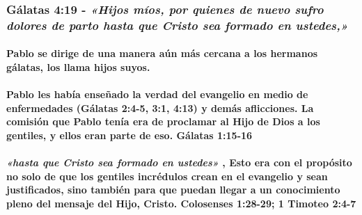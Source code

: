 \documentclass[11a pt,twoside]{article}
\newcommand{\scripture}[1]{%
  {\fontsize{12pt}{16pt}\selectfont\ScriptureFont\itshape #1}%
}
\let\oldsubsubsection\subsubsection
\renewcommand{\subsubsection}{\needspace{4\baselineskip}\oldsubsubsection}
\let\oldparagraph\paragraph
\renewcommand{\paragraph}{\needspace{3\baselineskip}\oldparagraph}
\begin{document}
\subsubsection{\texorpdfstring{Gálatas 4:19 -
\scripture{«Hijos míos, por quienes de nuevo sufro dolores de parto hasta que Cristo sea formado en ustedes,»}}{Gálatas 4:19 - }}\label{guxe1latas-419---hijos-muxedos-por-quienes-de-nuevo-sufro-dolores-de-parto-hasta-que-cristo-sea-formado-en-ustedes}

\paragraph{Pablo se dirige de una manera aún más cercana a los hermanos
gálatas, los llama hijos
suyos.}\label{pablo-se-dirige-de-una-manera-auxfan-muxe1s-cercana-a-los-hermanos-guxe1latas-los-llama-hijos-suyos.}

\paragraph{Pablo les había enseñado la verdad del evangelio en medio de
enfermedades (Gálatas 2:4-5, 3:1, 4:13) y demás aflicciones. La comisión
que Pablo tenía era de proclamar al Hijo de Dios a los gentiles, y ellos
eran parte de eso. Gálatas
1:15-16}\label{pablo-les-habuxeda-enseuxf1ado-la-verdad-del-evangelio-en-medio-de-enfermedades-guxe1latas-24-5-31-413-y-demuxe1s-aflicciones.-la-comisiuxf3n-que-pablo-tenuxeda-era-de-proclamar-al-hijo-de-dios-a-los-gentiles-y-ellos-eran-parte-de-eso.-guxe1latas-115-16}

\paragraph{\texorpdfstring{\scripture{«hasta que Cristo sea formado en ustedes»},
Esto era con el propósito no solo de que los gentiles incrédulos crean
en el evangelio y sean justificados, sino también para que puedan llegar
a un conocimiento pleno del mensaje del Hijo, Cristo. Colosenses
1:28-29; 1 Timoteo
2:4-7}{, Esto era con el propósito no solo de que los gentiles incrédulos crean en el evangelio y sean justificados, sino también para que puedan llegar a un conocimiento pleno del mensaje del Hijo, Cristo. Colosenses 1:28-29; 1 Timoteo 2:4-7}}\label{hasta-que-cristo-sea-formado-en-ustedes-esto-era-con-el-propuxf3sito-no-solo-de-que-los-gentiles-incruxe9dulos-crean-en-el-evangelio-y-sean-justificados-sino-tambiuxe9n-para-que-puedan-llegar-a-un-conocimiento-pleno-del-mensaje-del-hijo-cristo.-colosenses-128-29-1-timoteo-24-7}
\end{document}
